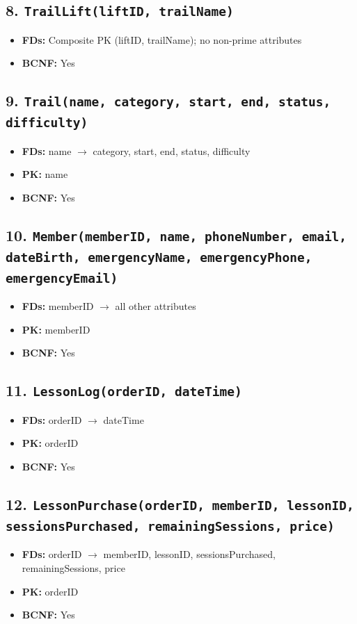 \documentclass[11pt]{scrartcl}
\begin{document}
\subsection*{8. \texttt{TrailLift(liftID, trailName)}}
\begin{itemize}
  \item \textbf{FDs:} Composite PK (liftID, trailName); no non-prime attributes
  \item \textbf{BCNF:} Yes
\end{itemize}

\subsection*{9. \texttt{Trail(name, category, start, end, status, difficulty)}}
\begin{itemize}
  \item \textbf{FDs:} name $\rightarrow$ category, start, end, status, difficulty
  \item \textbf{PK:} name
  \item \textbf{BCNF:} Yes
\end{itemize}

\subsection*{10. \texttt{Member(memberID, name, phoneNumber, email, dateBirth, emergencyName, emergencyPhone, emergencyEmail)}}
\begin{itemize}
  \item \textbf{FDs:} memberID $\rightarrow$ all other attributes
  \item \textbf{PK:} memberID
  \item \textbf{BCNF:} Yes
\end{itemize}

\subsection*{11. \texttt{LessonLog(orderID, dateTime)}}
\begin{itemize}
  \item \textbf{FDs:} orderID $\rightarrow$ dateTime
  \item \textbf{PK:} orderID
  \item \textbf{BCNF:} Yes
\end{itemize}

\subsection*{12. \texttt{LessonPurchase(orderID, memberID, lessonID, sessionsPurchased, remainingSessions, price)}}
\begin{itemize}
  \item \textbf{FDs:} orderID $\rightarrow$ memberID, lessonID, sessionsPurchased, remainingSessions, price
  \item \textbf{PK:} orderID
  \item \textbf{BCNF:} Yes
\end{itemize}
\end{document}
